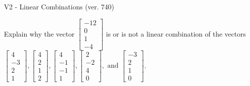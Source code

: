 \begin{exercise}
  \begin{exerciseTitle}V2 - Linear Combinations (ver. 740)\end{exerciseTitle}
  \begin{exerciseStatement}
    Explain why the vector \(\left[\begin{array}{c}
-12 \\
0 \\
1 \\
-4
\end{array}\right]\)  is or is not a linear 
	combination of the vectors \(\left[\begin{array}{c}
4 \\
-3 \\
2 \\
1
\end{array}\right] , \left[\begin{array}{c}
4 \\
2 \\
1 \\
2
\end{array}\right] , \left[\begin{array}{c}
4 \\
-1 \\
-1 \\
1
\end{array}\right] , \left[\begin{array}{c}
2 \\
-2 \\
4 \\
0
\end{array}\right] , \text{ and } \left[\begin{array}{c}
-3 \\
2 \\
1 \\
0
\end{array}\right]\).
	



\end{exerciseStatement}
\end{exercise}

